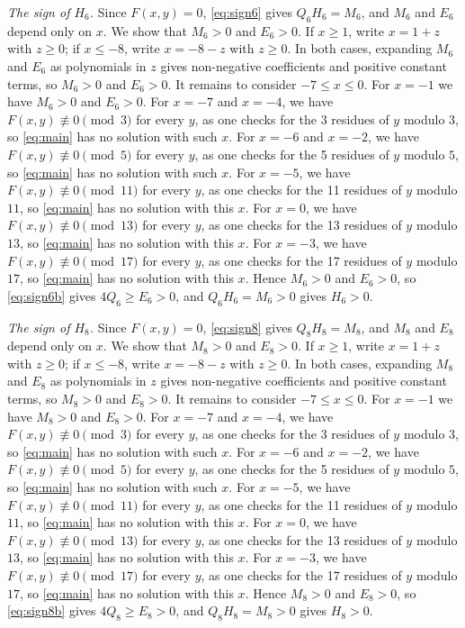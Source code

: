 \documentclass[11pt]{article}
\begin{document}
\emph{The sign of $H_{6}$.} Since $F(x,y)=0$, \eqref{eq:sign6} gives $Q_{6}H_{6}=M_{6}$, and $M_{6}$ and $E_{6}$ depend only on $x$. We show that $M_{6}>0$ and $E_{6}>0$. If $x\geq1$, write $x=1+z$ with $z\geq0$; if $x\leq-8$, write $x=-8-z$ with $z\geq0$. In both cases, expanding $M_{6}$ and $E_{6}$ as polynomials in $z$ gives non-negative coefficients and positive constant terms, so $M_{6}>0$ and $E_{6}>0$. It remains to consider $-7\leq x\leq0$. For $x=-1$ we have $M_{6}>0$ and $E_{6}>0$. For $x=-7$ and $x=-4$, we have $F(x,y)\not\equiv0\pmod{3}$ for every $y$, as one checks for the 3 residues of $y$ modulo $3$, so \eqref{eq:main} has no solution with such $x$. For $x=-6$ and $x=-2$, we have $F(x,y)\not\equiv0\pmod{5}$ for every $y$, as one checks for the 5 residues of $y$ modulo $5$, so \eqref{eq:main} has no solution with such $x$. For $x=-5$, we have $F(x,y)\not\equiv0\pmod{11}$ for every $y$, as one checks for the 11 residues of $y$ modulo $11$, so \eqref{eq:main} has no solution with this $x$. For $x=0$, we have $F(x,y)\not\equiv0\pmod{13}$ for every $y$, as one checks for the 13 residues of $y$ modulo $13$, so \eqref{eq:main} has no solution with this $x$. For $x=-3$, we have $F(x,y)\not\equiv0\pmod{17}$ for every $y$, as one checks for the 17 residues of $y$ modulo $17$, so \eqref{eq:main} has no solution with this $x$. Hence $M_{6}>0$ and $E_{6}>0$, so \eqref{eq:sign6b} gives $4Q_{6}\geq E_{6}>0$, and $Q_{6}H_{6}=M_{6}>0$ gives $H_{6}>0$.

\emph{The sign of $H_{8}$.} Since $F(x,y)=0$, \eqref{eq:sign8} gives $Q_{8}H_{8}=M_{8}$, and $M_{8}$ and $E_{8}$ depend only on $x$. We show that $M_{8}>0$ and $E_{8}>0$. If $x\geq1$, write $x=1+z$ with $z\geq0$; if $x\leq-8$, write $x=-8-z$ with $z\geq0$. In both cases, expanding $M_{8}$ and $E_{8}$ as polynomials in $z$ gives non-negative coefficients and positive constant terms, so $M_{8}>0$ and $E_{8}>0$. It remains to consider $-7\leq x\leq0$. For $x=-1$ we have $M_{8}>0$ and $E_{8}>0$. For $x=-7$ and $x=-4$, we have $F(x,y)\not\equiv0\pmod{3}$ for every $y$, as one checks for the 3 residues of $y$ modulo $3$, so \eqref{eq:main} has no solution with such $x$. For $x=-6$ and $x=-2$, we have $F(x,y)\not\equiv0\pmod{5}$ for every $y$, as one checks for the 5 residues of $y$ modulo $5$, so \eqref{eq:main} has no solution with such $x$. For $x=-5$, we have $F(x,y)\not\equiv0\pmod{11}$ for every $y$, as one checks for the 11 residues of $y$ modulo $11$, so \eqref{eq:main} has no solution with this $x$. For $x=0$, we have $F(x,y)\not\equiv0\pmod{13}$ for every $y$, as one checks for the 13 residues of $y$ modulo $13$, so \eqref{eq:main} has no solution with this $x$. For $x=-3$, we have $F(x,y)\not\equiv0\pmod{17}$ for every $y$, as one checks for the 17 residues of $y$ modulo $17$, so \eqref{eq:main} has no solution with this $x$. Hence $M_{8}>0$ and $E_{8}>0$, so \eqref{eq:sign8b} gives $4Q_{8}\geq E_{8}>0$, and $Q_{8}H_{8}=M_{8}>0$ gives $H_{8}>0$.
\end{document}
